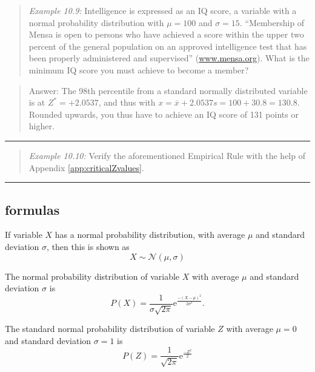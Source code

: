 \documentclass[
]{book}
\begin{document}
\begin{quote}
\emph{Example 10.9:}
Intelligence is expressed as an IQ score, a variable with a normal
probability distribution with \(\mu=100\) and \(\sigma=15\). ``Membership of Mensa
is open to persons who have achieved a score within the upper two
percent of the general population on an approved intelligence test that
has been properly administered and supervised''
(\url{www.mensa.org}). What is the minimum IQ score you must
achieve to become a member?
\end{quote}

\begin{quote}
Answer: The 98th percentile from a standard normally distributed
variable is at \(Z^*=+2.0537\), and thus with
\(x=\overline{x}+2.0537 s = 100+30.8 = 130.8\). Rounded upwards, you thus
have to achieve an IQ score of 131 points or higher.
\end{quote}

\begin{center}\rule{0.5\linewidth}{0.5pt}\end{center}

\begin{quote}
\emph{Example 10.10:}
Verify the aforementioned Empirical Rule with the help of
Appendix \ref{app:criticalZvalues}.
\end{quote}

\begin{center}\rule{0.5\linewidth}{0.5pt}\end{center}

\hypertarget{formulas-1}{%
\subsection{formulas}\label{formulas-1}}

If variable \(X\) has a normal probability distribution, with average \(\mu\)
and standard deviation \(\sigma\), then this is shown as
\begin{equation}
  X \sim \mathcal{N}(\mu,\sigma)
  \label{eq:normallydistributed}
\end{equation}

The normal probability distribution of variable \(X\) with average \(\mu\) and
standard deviation \(\sigma\) is
\begin{equation}
  P(X) = \frac{1}{\sigma \sqrt{2\pi}} \mbox{e}^{ \frac{-(X-\mu)^2}{2\sigma^2} }.
  \label{eq:prob-normal}
\end{equation}

The standard normal probability distribution of variable \(Z\) with average
\(\mu=0\) and standard deviation \(\sigma=1\) is
\begin{equation}
    P(Z) = \frac{1}{\sqrt{2\pi}} \mbox{e}^{ \frac{-Z^2}{2} }
  \label{eq:prob-standardnormal}
\end{equation}
\end{document}
